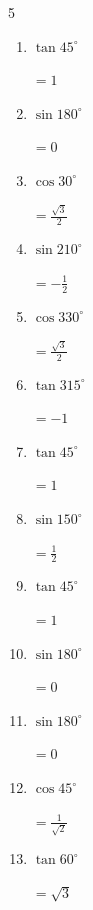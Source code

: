 \begin{multicols}{5}
\begin{enumerate}
  \item $\displaystyle \tan{45^\circ}$

        $\displaystyle =1$

  \item $\displaystyle \sin{180^\circ}$

        $\displaystyle =0$

  \item $\displaystyle \cos{30^\circ}$

        $\displaystyle =\frac{\sqrt{3}}{2}$

\columnbreak %

\resetques

  \item $\displaystyle \sin{210^\circ}$

        $\displaystyle =-\frac{1}{2}$

  \item $\displaystyle \cos{330^\circ}$

        $\displaystyle =\frac{\sqrt{3}}{2}$

  \item $\displaystyle \tan{315^\circ}$

        $\displaystyle =-1$

  \item $\displaystyle \tan{45^\circ}$

        $\displaystyle =1$

  \item $\displaystyle \sin{150^\circ}$

        $\displaystyle =\frac{1}{2}$

  \item $\displaystyle \tan{45^\circ}$

        $\displaystyle =1$

  \item $\displaystyle \sin{180^\circ}$

        $\displaystyle =0$

  \item $\displaystyle \sin{180^\circ}$

        $\displaystyle =0$

  \item $\displaystyle \cos{45^\circ}$

        $\displaystyle =\frac{1}{\sqrt{2}}$

  \item $\displaystyle \tan{60^\circ}$

        $\displaystyle =\sqrt{3}$


\end{enumerate}
\end{multicols}
